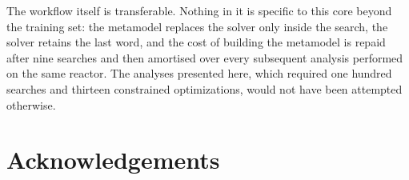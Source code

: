\documentclass{style/nseJournal}
\begin{document}
The workflow itself is transferable. Nothing in it is specific to this core
beyond the training set: the metamodel replaces the solver only inside the
search, the solver retains the last word, and the cost of building the metamodel
is repaid after nine searches and then amortised over every subsequent analysis
performed on the same reactor. The analyses presented here, which required one
hundred searches and thirteen constrained optimizations, would not have been
attempted otherwise.


\section*{Acknowledgements}



\pagebreak


\end{document}
